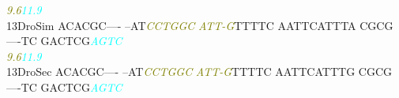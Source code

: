 \documentclass[11pt,twoside,reqno,a4paper]{article}
\begin{document}
{\hspace*{4\charwidth}\hspace*{7\charwidth}\hspace*{1\charwidth}\hspace*{14\charwidth}\textit{\textcolor{olive}{9.6}}\hspace*{1\charwidth}\hspace*{1\charwidth}\hspace*{1\charwidth}\hspace*{1\charwidth}\hspace*{39\charwidth}\textit{\textcolor{cyan}{11.9}}\hspace*{1\charwidth}\\
13\hspace*{2\charwidth}DroSim	ACACGC----	--AT\textit{\textcolor{olive}{C}}\textit{\textcolor{olive}{C}}\textit{\textcolor{olive}{T}}\textit{\textcolor{olive}{G}}\textit{\textcolor{olive}{G}}\textit{\textcolor{olive}{C}}	\textit{\textcolor{olive}{A}}\textit{\textcolor{olive}{T}}\textit{\textcolor{olive}{T}}\textit{\textcolor{olive}{-}}\textit{\textcolor{olive}{G}}TTTTC	AATTCATTTA	CGCG----TC	GACTCG\textit{\textcolor{cyan}{A}}\textit{\textcolor{cyan}{G}}\textit{\textcolor{cyan}{T}}\textit{\textcolor{cyan}{C}}	\\
\hspace*{4\charwidth}\hspace*{7\charwidth}\hspace*{1\charwidth}\hspace*{14\charwidth}\textit{\textcolor{olive}{9.6}}\hspace*{1\charwidth}\hspace*{1\charwidth}\hspace*{1\charwidth}\hspace*{1\charwidth}\hspace*{39\charwidth}\textit{\textcolor{cyan}{11.9}}\hspace*{1\charwidth}\\
13\hspace*{2\charwidth}DroSec	ACACGC----	--AT\textit{\textcolor{olive}{C}}\textit{\textcolor{olive}{C}}\textit{\textcolor{olive}{T}}\textit{\textcolor{olive}{G}}\textit{\textcolor{olive}{G}}\textit{\textcolor{olive}{C}}	\textit{\textcolor{olive}{A}}\textit{\textcolor{olive}{T}}\textit{\textcolor{olive}{T}}\textit{\textcolor{olive}{-}}\textit{\textcolor{olive}{G}}TTTTC	AATTCATTTG	CGCG----TC	GACTCG\textit{\textcolor{cyan}{A}}\textit{\textcolor{cyan}{G}}\textit{\textcolor{cyan}{T}}\textit{\textcolor{cyan}{C}}	\\
}
\end{document}
